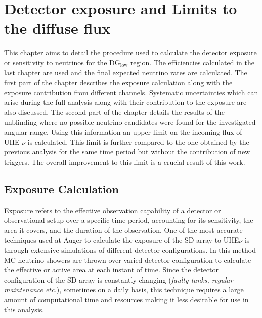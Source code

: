 
\chapter{Detector exposure and Limits to the diffuse flux}
\label{sec:align}
 
This chapter aims to detail the procedure used to calculate the detector exposure or sensitivity to neutrinos for the DG$\mathrm{_{\text{low}}}$ region. The efficiencies calculated in the last chapter are used and the final expected neutrino rates are calculated. The first part of the chapter describes the exposure calculation along with the exposure contribution from different channels. Systematic uncertainties which can arise during the full analysis along with their contribution to the exposure are also discussed. 
The second part of the chapter details the results of the unblinding where no possible neutrino candidates were found for the investigated angular range. Using this information an upper limit on the incoming flux of UHE $\nu$ is calculated. This limit is further compared to the one obtained by the previous analysis for the same time period but without the contribution of new triggers. The overall improvement to this limit is a crucial result of this work. 


\section{Exposure Calculation}
\label{sec:det_exposure_calc}

Exposure refers to the effective observation capability of a detector or observational setup over a specific time period, accounting for its sensitivity, the area it covers, and the duration of the observation. One of the most accurate techniques used at Auger to calculate the exposure of the SD array to UHE$\nu$ is through extensive simulations of different detector configurations. In this method MC neutrino showers are thrown over varied detector configuration to calculate the effective or active area at each instant of time. Since the detector configuration of the SD array is constantly changing (\textit{faulty tanks, regular maintenance etc.}), sometimes on a daily basis, this technique requires a large amount of computational time and resources making it less desirable for use in this analysis. 

